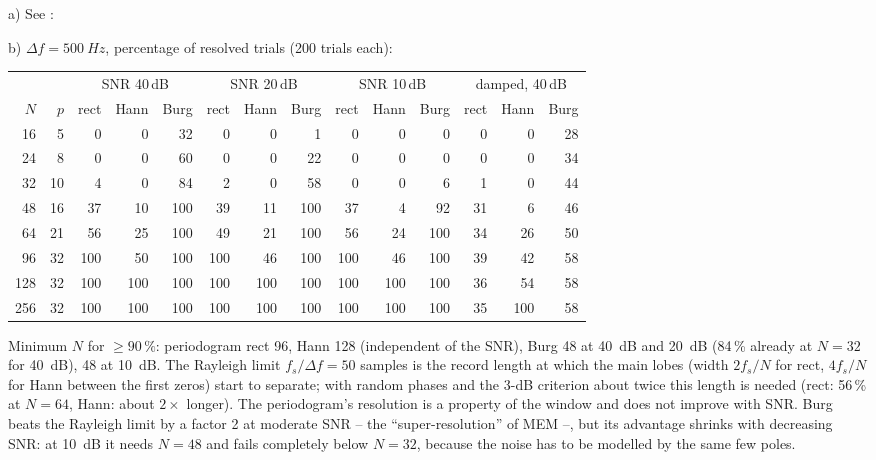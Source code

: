 \begin{solution}
a) See :

b) $\Delta f=\SI{500}{Hz}$, percentage of resolved trials (200 trials each):
\begin{center}
\small
\begin{tabular}{@{}rr|rrr|rrr|rrr|rrr@{}}
\toprule
 & & \multicolumn{3}{c|}{SNR 40\,dB} & \multicolumn{3}{c|}{SNR 20\,dB} &
 \multicolumn{3}{c|}{SNR 10\,dB} & \multicolumn{3}{c}{damped, 40\,dB}\\
$N$ & $p$ & rect & Hann & Burg & rect & Hann & Burg & rect & Hann & Burg & rect & Hann & Burg\\
\midrule
16 & 5 & 0 & 0 & 32 & 0 & 0 & 1 & 0 & 0 & 0 & 0 & 0 & 28\\
24 & 8 & 0 & 0 & 60 & 0 & 0 & 22 & 0 & 0 & 0 & 0 & 0 & 34\\
32 & 10 & 4 & 0 & 84 & 2 & 0 & 58 & 0 & 0 & 6 & 1 & 0 & 44\\
48 & 16 & 37 & 10 & 100 & 39 & 11 & 100 & 37 & 4 & 92 & 31 & 6 & 46\\
64 & 21 & 56 & 25 & 100 & 49 & 21 & 100 & 56 & 24 & 100 & 34 & 26 & 50\\
96 & 32 & 100 & 50 & 100 & 100 & 46 & 100 & 100 & 46 & 100 & 39 & 42 & 58\\
128 & 32 & 100 & 100 & 100 & 100 & 100 & 100 & 100 & 100 & 100 & 36 & 54 & 58\\
256 & 32 & 100 & 100 & 100 & 100 & 100 & 100 & 100 & 100 & 100 & 35 & 100 & 58\\
\bottomrule
\end{tabular}
\end{center}
Minimum $N$ for $\ge90\,\%$: periodogram rect 96, Hann 128 (independent of the SNR),
Burg 48 at \SI{40}{dB} and \SI{20}{dB} (84\,\% already at $N=32$ for \SI{40}{dB}), 48 at
\SI{10}{dB}. The Rayleigh limit $f_s/\Delta f=50$ samples is the record length at which
the main lobes (width $2f_s/N$ for rect, $4f_s/N$ for Hann between the first zeros)
start to separate; with random phases and the 3-dB criterion about twice this length
is needed (rect: 56\,\% at $N=64$, Hann: about $2\times$ longer). The periodogram's
resolution is a property of the window and does not improve with SNR. Burg beats the
Rayleigh limit by a factor 2 at moderate SNR -- the ``super-resolution'' of MEM --,
but its advantage shrinks with decreasing SNR: at \SI{10}{dB} it needs $N=48$ and fails
completely below $N=32$, because the noise has to be modelled by the same few poles.


\end{solution}
